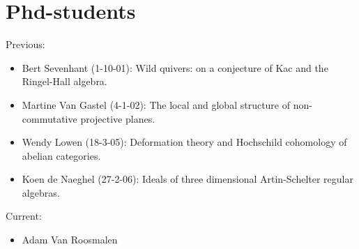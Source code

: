 \documentclass{amsart}
\begin{document}
\section*{Phd-students}
\noindent Previous:
\begin{itemize}
\item Bert Sevenhant (1-10-01): Wild quivers: on a conjecture of Kac
  and the Ringel-Hall algebra.
\item Martine Van Gastel (4-1-02): The local and global structure of
  non-commutative projective planes.
\item
Wendy Lowen (18-3-05): Deformation theory and Hochschild cohomology
of abelian categories.
\item Koen de Naeghel (27-2-06):  Ideals of three dimensional
Artin-Schelter regular algebras.
\end{itemize}
Current:
\begin{itemize}
\item Adam Van Roosmalen
\end{itemize}

\end{document}
